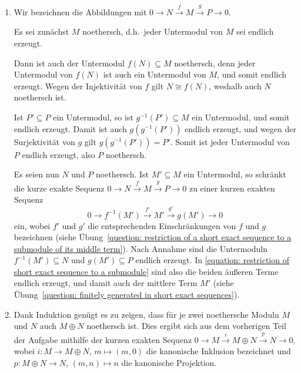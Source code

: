 \begin{solution}
  \begin{enumerate}
    \item
      Wir bezeichnen die Abbildungen mit $0 \to N \xrightarrow{f} M \xrightarrow{g} P \to 0$.
      
      Es sei zunächst $M$ noethersch, d.h.\ jeder Untermodul von $M$ sei endlich erzeugt.
      
      Dann ist auch der Untermodul $f(N) \subseteq M$ noethersch, denn jeder Untermodul von $f(N)$ ist auch ein Untermodul von $M$, und somit endlich erzeugt.
      Wegen der Injektivität von $f$ gilt $N \cong f(N)$, weshalb auch $N$ noethersch ist.
      
      Ist $P' \subseteq P$ ein Untermodul, so ist $g^{-1}(P') \subseteq M$ ein Untermodul, und somit endlich erzeugt.
      Damit ist auch $g(g^{-1}(P'))$ endlich erzeugt, und wegen der Surjektivität von $g$ gilt $g(g^{-1}(P')) = P'$.
      Somit ist jeder Untermodul von $P$ endlich erzeugt, also $P$ noethersch.
      
      Es seien nun $N$ und $P$ noethersch.
      Ist $M' \subseteq M$ ein Untermodul, so schränkt die kurze exakte Sequenz $0 \to N \xrightarrow{f} M \xrightarrow{g} P \to 0$ zu einer kurzen exakten Sequenz
      \begin{equation}
        \label{equation: restriction of short exact sequence to a submodule}
        0 \to f^{-1}(M') \xrightarrow{f'} M' \xrightarrow{g'} g(M') \to 0
      \end{equation}
      ein, wobei $f'$ und $g'$ die entsprechenden Einschränkungen von $f$ und $g$ bezeichnen (siehe Übung~\ref{question: restriction of a short exact sequence to a submodule of its middle term}).
      Nach Annahme sind die Untermoduln $f^{-1}(M') \subseteq N$ und $g(M') \subseteq P$ endlich erzeugt.
      In \eqref{equation: restriction of short exact sequence to a submodule} sind also die beiden äußeren Terme endlich erzeugt, und damit auch der mittlere Term $M'$ (siehe Übung~\ref{question: finitely generated in short exact sequences}).
      
    \item
      Dank Induktion genügt es zu zeigen, dass für je zwei noethersche Moduln $M$ und $N$ auch $M \oplus N$ noethersch ist.
      Dies ergibt sich aus dem vorherigen Teil der Aufgabe mithilfe der kurzen exakten Sequenz $0 \to M \xrightarrow{i} M \oplus N \xrightarrow{p} N \to 0$, wobei $i \colon M \to M \oplus N$, $m \mapsto (m,0)$ die kanonische Inklusion bezeichnet und $p \colon M \oplus N \to N$, $(m,n) \mapsto n$ die kanonische Projektion.
      

\end{enumerate}
\end{solution}
